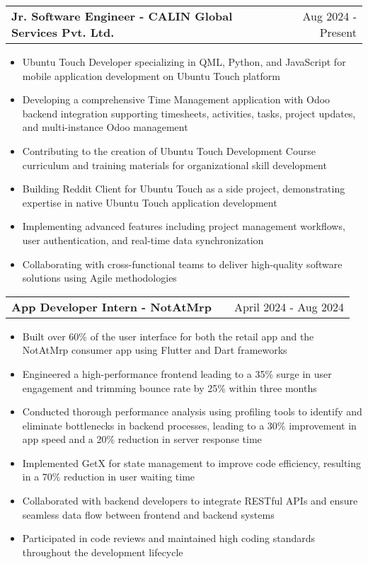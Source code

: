 \documentclass[a4paper,12pt]{article}
\makeatletter
\newenvironment{joblong}[2]
    {
    \begin{tabularx}{\linewidth}{@{}l X r@{}}
    \textbf{#1} & \hfill &  #2 \\[3.75pt]
    \end{tabularx}
    \begin{minipage}[t]{\linewidth}
    \begin{itemize}[nosep,after=\strut, leftmargin=1em, itemsep=3pt,label=--]
    }
    {
    \end{itemize}
    \end{minipage}    
    }
\makeatother
\begin{document}
\begin{joblong}{Jr. Software Engineer - CALIN Global Services Pvt. Ltd.}{Aug 2024 - Present}
\item Ubuntu Touch Developer specializing in QML, Python, and JavaScript for mobile application development on Ubuntu Touch platform
\item Developing a comprehensive Time Management application with Odoo backend integration supporting timesheets, activities, tasks, project updates, and multi-instance Odoo management
\item Contributing to the creation of Ubuntu Touch Development Course curriculum and training materials for organizational skill development
\item Building Reddit Client for Ubuntu Touch as a side project, demonstrating expertise in native Ubuntu Touch application development
\item Implementing advanced features including project management workflows, user authentication, and real-time data synchronization
\item Collaborating with cross-functional teams to deliver high-quality software solutions using Agile methodologies
\end{joblong}

\begin{joblong}{App Developer Intern - NotAtMrp}{April 2024 - Aug 2024}
\item Built over 60\% of the user interface for both the retail app and the NotAtMrp consumer app using Flutter and Dart frameworks
\item Engineered a high-performance frontend leading to a 35\% surge in user engagement and trimming bounce rate by 25\% within three months
\item Conducted thorough performance analysis using profiling tools to identify and eliminate bottlenecks in backend processes, leading to a 30\% improvement in app speed and a 20\% reduction in server response time
\item Implemented GetX for state management to improve code efficiency, resulting in a 70\% reduction in user waiting time
\item Collaborated with backend developers to integrate RESTful APIs and ensure seamless data flow between frontend and backend systems
\item Participated in code reviews and maintained high coding standards throughout the development lifecycle
\end{joblong}
\end{document}

